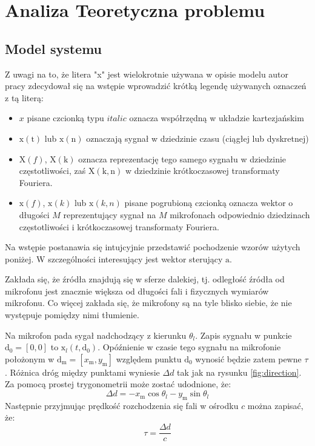\chapter{Analiza Teoretyczna problemu}
\label{chapter-2}
\section{Model systemu}

Z uwagi na to, że litera "x" jest wielokrotnie używana w opisie modelu autor pracy zdecydował się na wstępie wprowadzić krótką legendę używanych oznaczeń z tą literą:
\begin{itemize}
    \item $x$ pisane czcionką typu $italic$ oznacza współrzędną w układzie kartezjańskim
    \item $\mathrm{x(t)}$ lub $\mathrm{x(n)}$ oznaczają sygnał w dziedzinie czasu (ciągłej lub dyskretnej)
    \item $\mathrm{X}(f)$, $\mathrm{X(k)}$ oznacza reprezentację tego samego sygnału w dziedzinie częstotliwości, zaś $\mathrm{X(k,n)}$ w dziedzinie krótkoczasowej transformaty Fouriera.
    \item $\bm{\mathrm{x}}(f)$, $\bm{\mathrm{x}}(k)$ lub $\bm{\mathrm{x}}(k,n)$ pisane pogrubioną czcionką oznacza wektor o długości $M$ reprezentujący sygnał na $M$ mikrofonach odpowiednio dziedzinach częstotliwości i krótkoczasowej transformaty Fouriera.
\end{itemize}


\noindent Na wstępie postanawia się intujcyjnie przedstawić pochodzenie wzorów użytych poniżej. W szczególności interesujący jest wektor sterujący $\bm{\mathrm{a}}$.

\noindent Zakłada się, że źródła znajdują się w sferze dalekiej, tj. odległość źródła od mikrofonu jest znacznie większa od długości fali i fizycznych wymiarów mikrofonu. Co więcej zakłada się, że mikrofony są na tyle blisko siebie, że nie występuje pomiędzy nimi tłumienie.

\noindent Na mikrofon pada sygał nadchodzący z kierunku $\theta_{l}$.
Zapis sygnału w punkcie $\bm{\mathrm{d}}_{0} = [0,0]$ to $\mathrm{x}_{l}(t,\bm{\mathrm{d}}_{0})$. Opóźnienie w czasie tego sygnału na mikrofonie położonym w $\bm{\mathrm{d}}_{\mathrm{m}} = [x_{\mathrm{m}},y_{\mathrm{m}}]$ względem punktu $\bm{\mathrm{d}}_{0}$ wynosić będzie zatem pewne $\tau$. Różnica dróg między punktami wyniesie $\Delta d$ tak jak na rysunku \ref{fig:direction}. Za pomocą prostej trygonometrii może zostać udodnione, że:
\begin{equation}
    \label{equation:2.4}
    \Delta d = -x_{\mathrm{m}}\cos{\theta_{l}} - y_{\mathrm{m}}\sin{\theta_{l}}
\end{equation}
Następnie przyjmując prędkość rozchodzenia się fali w ośrodku $c$ można zapisać, że:
\begin{equation}
    \label{equation:2.5}
    \tau = \dfrac{\Delta d}{c}
\end{equation}

